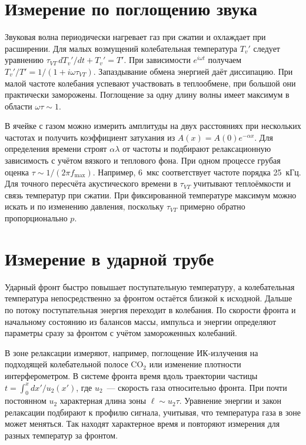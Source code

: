 \documentclass[12pt,a4paper]{article}
\begin{document}
\section{Измерение по поглощению звука}

Звуковая волна периодически нагревает газ при сжатии и охлаждает при
расширении. Для малых возмущений колебательная температура
$T_v'$ следует уравнению
$\tau_{VT}\,dT_v'/dt+T_v'=T'$. При зависимости $e^{i\omega t}$
получаем $T_v'/T'=1/(1+i\omega\tau_{VT})$. Запаздывание обмена энергией
даёт диссипацию. При малой частоте колебания успевают участвовать в
теплообмене, при большой они практически заморожены. Поглощение за одну
длину волны имеет максимум в области $\omega\tau\sim1$.

В ячейке с газом можно измерить амплитуды на двух расстояниях при
нескольких частотах и получить коэффициент затухания из
$A(x)=A(0)e^{-\alpha x}$. Для определения времени строят $\alpha\lambda$
от частоты и подбирают релаксационную зависимость с учётом вязкого и
теплового фона. При одном процессе грубая оценка
$\tau\sim1/(2\pi f_{\max})$. Например, $6$~мкс соответствует
частоте порядка 25~кГц. Для точного пересчёта акустического времени
в $\tau_{VT}$ учитывают теплоёмкости и связь температур при сжатии.
При фиксированной температуре максимум можно искать и по изменению
давления, поскольку $\tau_{VT}$ примерно обратно пропорционально $p$.

\section{Измерение в ударной трубе}

Ударный фронт быстро повышает поступательную температуру, а колебательная
температура непосредственно за фронтом остаётся близкой к исходной.
Дальше по потоку поступательная энергия переходит в колебания.
По скорости фронта и начальному состоянию из балансов массы, импульса
и энергии определяют параметры сразу за фронтом с учётом замороженных
колебаний.

В зоне релаксации измеряют, например, поглощение ИК-излучения на
подходящей колебательной полосе CO$_2$ или изменение плотности
интерферометром. В системе фронта время вдоль траектории частицы
$t=\int_0^x dx'/u_2(x')$, где $u_2$~--- скорость газа относительно
фронта. При почти постоянном $u_2$ характерная длина зоны
$\ell\sim u_2\tau$. Уравнение энергии и закон релаксации подбирают к
профилю сигнала, учитывая, что температура газа в зоне может меняться.
Так находят характерное время и повторяют измерения для разных
температур за фронтом.
\end{document}
